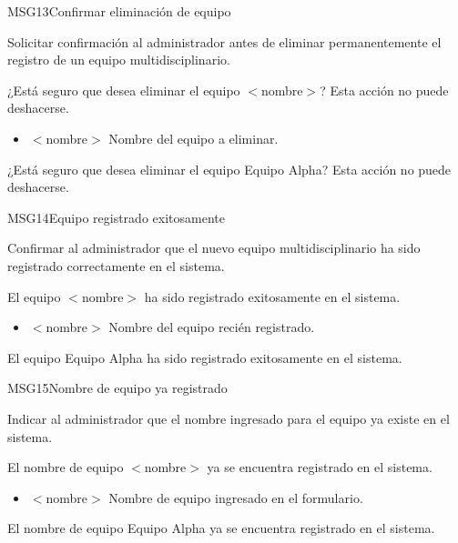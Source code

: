 \begin{cdtMessage}[msgWarningColor]{MSG13}{Confirmar eliminación de equipo}
	\item[Propósito:] Solicitar confirmación al administrador 
	antes de eliminar permanentemente el registro de un equipo 
	multidisciplinario.
	\item[Redacción:] ¿Está seguro que desea eliminar el equipo 
	$<$nombre$>$? Esta acción no puede deshacerse.
	\item[Parámetros:] \hspace{1cm}
	\begin{itemize}
		\item $<$nombre$>$ Nombre del equipo a eliminar.
	\end{itemize}
	\item[Ejemplos:] ¿Está seguro que desea eliminar el equipo 
	Equipo Alpha? Esta acción no puede deshacerse.
\end{cdtMessage}

\begin{cdtMessage}[msgInfoColor]{MSG14}{Equipo registrado exitosamente}
	\item[Propósito:] Confirmar al administrador que el nuevo 
	equipo multidisciplinario ha sido registrado correctamente 
	en el sistema.
	\item[Redacción:] El equipo $<$nombre$>$ ha sido registrado 
	exitosamente en el sistema.
	\item[Parámetros:] \hspace{1cm}
	\begin{itemize}
		\item $<$nombre$>$ Nombre del equipo recién registrado.
	\end{itemize}
	\item[Ejemplos:] El equipo Equipo Alpha ha sido registrado 
	exitosamente en el sistema.
\end{cdtMessage}

\begin{cdtMessage}[msgErrorColor]{MSG15}{Nombre de equipo ya registrado}
	\item[Propósito:] Indicar al administrador que el nombre 
	ingresado para el equipo ya existe en el sistema.
	\item[Redacción:] El nombre de equipo $<$nombre$>$ ya se 
	encuentra registrado en el sistema.
	\item[Parámetros:] \hspace{1cm}
	\begin{itemize}
		\item $<$nombre$>$ Nombre de equipo ingresado 
		en el formulario.
	\end{itemize}
	\item[Ejemplos:] El nombre de equipo Equipo Alpha ya se 
	encuentra registrado en el sistema.
\end{cdtMessage}


